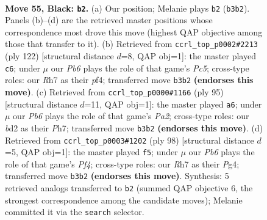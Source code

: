 \documentclass[11pt]{article}
\begin{document}
\clearpage

\begin{figure}[p]\centering
\begin{subfigure}{0.46\textwidth}\centering
\resizebox{\linewidth}{!}{%
\newchessgame
\chessboard[
  setfen={2R5/7r/3P1k2/1p6/4K3/rp6/3B4/8 b - - 0 55},
  showmover=false,
  pgfstyle=straightmove, color=movearrow, markmove={b3-b2}
]}
\caption{}
\end{subfigure}\hfill
\begin{subfigure}{0.46\textwidth}\centering
\resizebox{\linewidth}{!}{%
\newchessgame
\chessboard[
  setfen={3r4/7p/5k2/R1P5/5p2/2K5/7P/8 w - - 0 62},
  showmover=false,
  pgfstyle=straightmove, color=movearrow, markmove={c5-c6}
]}
\caption{}
\end{subfigure}
\\[4pt]
\begin{subfigure}{0.46\textwidth}\centering
\resizebox{\linewidth}{!}{%
\newchessgame
\chessboard[
  setfen={8/p2r3p/8/2k4P/P3K3/1R6/8/8 b - - 4 48},
  showmover=false,
  pgfstyle=straightmove, color=movearrow, markmove={a7-a6}
]}
\caption{}
\end{subfigure}\hfill
\begin{subfigure}{0.46\textwidth}\centering
\resizebox{\linewidth}{!}{%
\newchessgame
\chessboard[
  setfen={8/6k1/2b1p3/8/3K1PP1/8/5R2/1r6 w - - 0 50},
  showmover=false,
  pgfstyle=straightmove, color=movearrow, markmove={f4-f5}
]}
\caption{}
\end{subfigure}
\caption{\textbf{Move 55, Black: \texttt{b2}.} (a) Our position; Melanie plays \texttt{b2} (\texttt{b3b2}). Panels (b)--(d) are the retrieved master positions whose correspondence most drove this move (highest QAP objective among those that transfer to it). (b) Retrieved from \texttt{ccrl\_top\_p0002\#2213} (ply 122) [structural distance $d$=8, QAP obj=1]: the master played \texttt{c6}; under $\mu$ our \emph{Pb6} plays the role of that game's \emph{Pc5}; cross-type roles: our \emph{R}h7 as their \emph{p}f4; transferred move \texttt{b3b2} \textbf{(endorses this move)}. (c) Retrieved from \texttt{ccrl\_top\_p0000\#1166} (ply 95) [structural distance $d$=11, QAP obj=1]: the master played \texttt{a6}; under $\mu$ our \emph{Pb6} plays the role of that game's \emph{Pa2}; cross-type roles: our \emph{b}d2 as their \emph{P}h7; transferred move \texttt{b3b2} \textbf{(endorses this move)}. (d) Retrieved from \texttt{ccrl\_top\_p0003\#1202} (ply 98) [structural distance $d$=5, QAP obj=1]: the master played \texttt{f5}; under $\mu$ our \emph{Pb6} plays the role of that game's \emph{Pf4}; cross-type roles: our \emph{R}h7 as their \emph{P}g4; transferred move \texttt{b3b2} \textbf{(endorses this move)}. Synthesis: 5 retrieved analogs transferred to \texttt{b2} (summed QAP objective 6, the strongest correspondence among the candidate moves); Melanie committed it via the \texttt{search} selector.}
\label{fig:thought-m109}
\end{figure}
\end{document}

